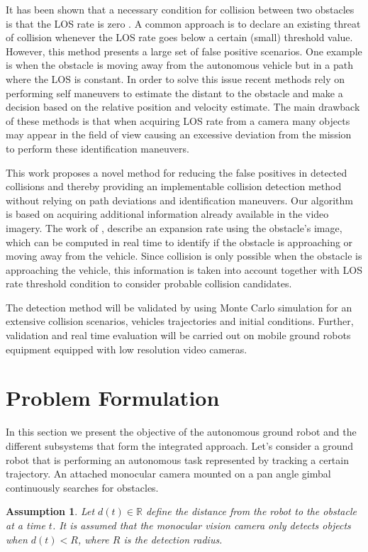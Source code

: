 \documentclass[]{aiaa-tc}%
\newtheorem{asm}{Assumption}
\begin{document}
It has been shown that a necessary condition for collision between two obstacles is that the LOS rate is zero \cite{kochenderfer2008hazard}. A common approach is to declare an existing threat of collision whenever the LOS rate goes below a certain (small) threshold value. However, this method presents a large set of false positive scenarios. One example is when the obstacle is moving away from the autonomous vehicle but in a path where the LOS is constant. In order to solve this issue recent methods rely on performing self maneuvers \cite{kochenderfer2008hazard} to estimate the distant to the obstacle and make a decision based on the relative position and velocity estimate. The main drawback of these methods is that when acquiring LOS rate from a camera many objects may appear in the field of view causing an excessive deviation from the mission to perform these identification maneuvers. %

This work proposes a novel method for reducing the false positives in detected collisions and thereby providing an implementable collision detection method without relying on path deviations and identification maneuvers. Our algorithm is based on acquiring additional information already available in the video imagery. The work of \cite{lee1976theory},\cite{lee1980optic} describe an expansion rate using the obstacle’s image, which can be computed in real time to identify if the obstacle is approaching or moving away from the vehicle. Since collision is only possible when the obstacle is approaching the vehicle, this information is taken into account together with LOS rate threshold condition to consider probable collision candidates.

The detection method will be validated by using Monte Carlo simulation for an extensive collision scenarios, vehicles trajectories and initial conditions. Further, validation and real time evaluation will be carried out on mobile ground robots equipment equipped with low resolution video cameras.

\section{Problem Formulation}



In this section we present the objective of the autonomous ground robot and the different subsystems that form the integrated approach. Let's consider a ground robot that is performing an autonomous task represented by tracking a certain trajectory. An attached monocular camera mounted on a pan angle gimbal continuously searches for obstacles. 
\begin{asm} \label{detRange}
	Let $d(t) \in \mathbb{R}$ define the distance from the robot to the obstacle at a time $t$. It is assumed that the monocular vision camera only detects objects when $d(t) < R$, where $R$ is the detection radius.
\end{asm}
\end{document}
